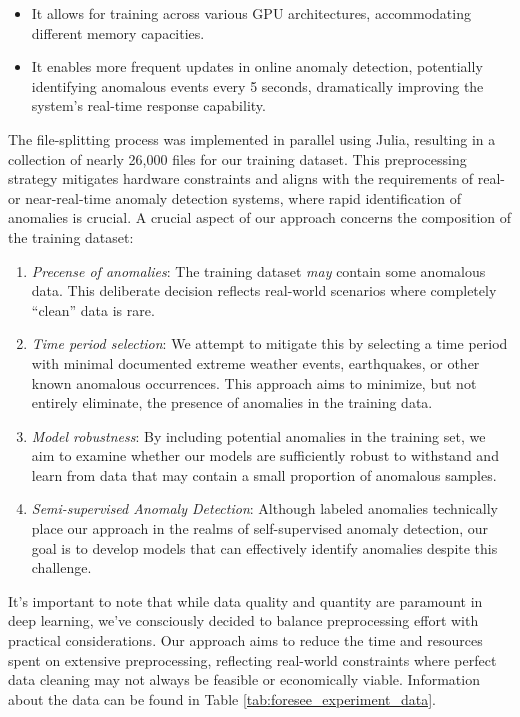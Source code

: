 \begin{itemize}
    \item It allows for training across various GPU architectures, accommodating different memory capacities.
    \item It enables more frequent updates in online anomaly detection, potentially identifying anomalous events every 5 seconds, dramatically improving the system's real-time response capability.
\end{itemize}


The file-splitting process was implemented in parallel using Julia, resulting in a collection of nearly 26,000 files for our training dataset. This preprocessing strategy mitigates hardware constraints and aligns with the requirements of real- or near-real-time anomaly detection systems, where rapid identification of anomalies is crucial. A crucial aspect of our approach concerns the composition of the training dataset:

\begin{enumerate}
    \item \textit{Precense of anomalies}: The training dataset \textit{may} contain some anomalous data. This deliberate decision reflects real-world scenarios where completely ``clean'' data is rare.
    \item \textit{Time period selection}: We attempt to mitigate this by selecting a time period with minimal documented extreme weather events, earthquakes, or other known anomalous occurrences. This approach aims to minimize, but not entirely eliminate, the presence of anomalies in the training data.
    \item \textit{Model robustness}: By including potential anomalies in the training set, we aim to examine whether our models are sufficiently robust to withstand and learn from data that may contain a small proportion of anomalous samples.
    \item \textit{Semi-supervised Anomaly Detection}: Although labeled anomalies technically place our approach in the realms of self-supervised anomaly detection, our goal is to develop models that can effectively identify anomalies despite this challenge.
\end{enumerate}

It's important to note that while data quality and quantity are paramount in deep learning, we've consciously decided to balance preprocessing effort with practical considerations. Our approach aims to reduce the time and resources spent on extensive preprocessing, reflecting real-world constraints where perfect data cleaning may not always be feasible or economically viable. Information about the data can be found in Table \ref{tab:foresee_experiment_data}. 


